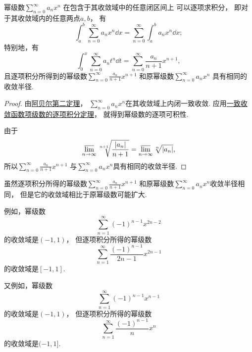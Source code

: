 \begin{property}\label{theorem:无穷级数.幂级数的和函数的性质2}
幂级数\(\sum_{n=0}^\infty a_n x^n\)
在包含于其收敛域中的任意闭区间上
可以逐项求积分，
即对于其收敛域内的任意两点\(a,b\)，
有\begin{equation}
	\int_a^b \sum_{n=0}^\infty a_n x^n \dd{x}
	= \sum_{n=0}^\infty \int_a^b a_n x^n \dd{x};
\end{equation}
特别地，有\begin{equation}
	\int_0^x \sum_{n=0}^\infty a_n t^n \dd{t}
	= \sum_{n=0}^\infty \frac{a_n}{n+1} x^{n+1},
\end{equation}
且逐项积分所得到的幂级数\(\sum_{n=0}^\infty \frac{a_n}{n+1} x^{n+1}\)
和原幂级数\(\sum_{n=0}^\infty a_n x^n\)
具有相同的收敛半径.
\begin{proof}
由\hyperref[theorem:无穷级数.阿贝尔定理2]{阿贝尔第二定理}，
\(\sum_{n=0}^\infty a_n x^n\)在其收敛域上内闭一致收敛.
应用\hyperref[theorem:函数项级数.连续函数项级数的一致收敛性保证和函数的可积性]{一致收敛函数项级数的逐项积分定理}，
就得到幂级数的逐项可积性.

由于\begin{equation*}
	\varlimsup_{n\to\infty} \sqrt[n+1]{\frac{\abs{a_n}}{n+1}}
	= \varlimsup_{n\to\infty} \sqrt[n]{\abs{a_n}},
\end{equation*}
所以\(\sum_{n=0}^\infty \frac{a_n}{n+1} x^{n+1}\)
与\(\sum_{n=0}^\infty a_n x^n\)具有相同的收敛半径.
\end{proof}
\end{property}
\begin{remark}
虽然逐项积分所得的幂级数\(\sum_{n=0}^\infty \frac{a_n}{n+1} x^{n+1}\)
和原幂级数\(\sum_{n=0}^\infty a_n x^n\)收敛半径相同，
但是它的收敛域相比于原幂级数可能扩大.

例如，幂级数\begin{equation*}
	\sum_{n=1}^\infty (-1)^{n-1} x^{2n-2}
\end{equation*}的收敛域是\((-1,1)\)，
但逐项积分所得的幂级数\begin{equation*}
	\sum_{n=1}^\infty \frac{(-1)^{n-1}}{2n-1} x^{2n-1}
\end{equation*}的收敛域是\([-1,1]\).

又例如，幂级数\begin{equation*}
	\sum_{n=1}^\infty (-1)^{n-1} x^{n-1}
\end{equation*}的收敛域是\((-1,1)\)，
但逐项积分所得的幂级数\begin{equation*}
	\sum_{n=1}^\infty \frac{(-1)^{n-1}}{n} x^n
\end{equation*}的收敛域是\((-1,1]\).
\end{remark}


